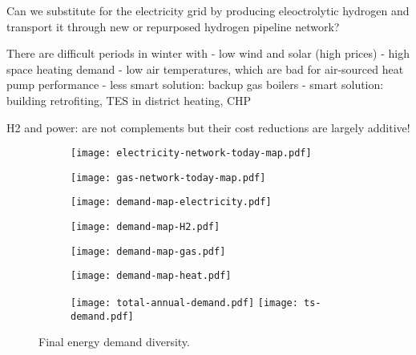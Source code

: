 Can we substitute for the electricity grid by producing eleoctrolytic hydrogen
and transport it through new or repurposed hydrogen pipeline network?

There are difficult periods in winter with
- low wind and solar (high prices)
- high space heating demand
- low air temperatures, which are bad for air-sourced heat pump performance
- less smart solution: backup gas boilers
- smart solution: building retrofiting, TES in district heating, CHP

H2 and power: are not complements but their cost reductions are largely additive!



\begin{figure}
    \centering
    \begin{subfigure}[t]{0.49\textwidth}
        \centering
        \texttt{[image: electricity-network-today-map.pdf]}
    \end{subfigure}
    \begin{subfigure}[t]{0.49\textwidth}
        \centering
        \texttt{[image: gas-network-today-map.pdf]}
    \end{subfigure}
    \begin{subfigure}[t]{0.49\textwidth}
        \centering
        \texttt{[image: demand-map-electricity.pdf]}
    \end{subfigure}
    \begin{subfigure}[t]{0.49\textwidth}
        \centering
        \texttt{[image: demand-map-H2.pdf]}
    \end{subfigure}
    \begin{subfigure}[t]{0.49\textwidth}
        \centering
        \texttt{[image: demand-map-gas.pdf]}
    \end{subfigure}
    \begin{subfigure}[t]{0.49\textwidth}
        \centering
        \texttt{[image: demand-map-heat.pdf]}
    \end{subfigure}
    \begin{subfigure}[t]{\textwidth}
        \centering
        \texttt{[image: total-annual-demand.pdf]}
        \texttt{[image: ts-demand.pdf]}
    \end{subfigure}
    \caption{Final energy demand diversity.}
    \label{fig:demand-space}
\end{figure}
\restoregeometry